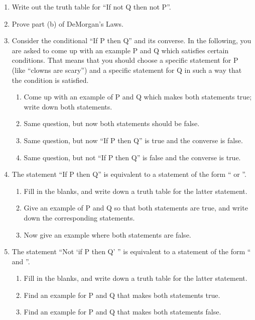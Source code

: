 \probsec{~\ref{sec:negat-logic-equiv}}
\begin{enumerate}
    \item Write out the truth table for ``If not Q then not P''.

    \item Prove part (b) of DeMorgan's Laws.

    \item Consider the conditional ``If P then Q'' and its converse. In the following, you are asked to come up with an example P and Q which satisfies certain conditions. That means that you should choose a specific statement for P (like ``clowns are scary'') and a specific statement for Q in such a way that the condition is satisfied.
  \begin{enumerate}
      \item Come up with an example of P and Q which makes both statements true; write down both statements.
      \item Same question, but now both statements should be false.
      \item Same question, but now ``If P then Q'' is true and the converse is false.
      \item Same question, but not ``If P then Q'' is false and the converse is true.
  \end{enumerate}

    \item The statement ``If P then Q'' is equivalent to a statement of the form ``\underline{\hspace{.5in}} or \underline{\hspace{.5in}}''.
  \begin{enumerate}
      \item Fill in the blanks, and write down a truth table for the latter statement.
      \item Give an example of P and Q so that both statements are true, and write down the corresponding statements.
      \item Now give an example where both statements are false.
  \end{enumerate}

    \item The statement ``Not `if P then Q' '' is equivalent to a statement of the form ``\underline{\hspace{.5in}} and \underline{\hspace{.5in}}''.
  \begin{enumerate}
      \item  Fill in the blanks, and write down a truth table for the latter statement.
      \item Find an example for P and Q that makes both statements true.
      \item Find an example for P and Q that makes both statements false.
  \end{enumerate}

\end{enumerate}
